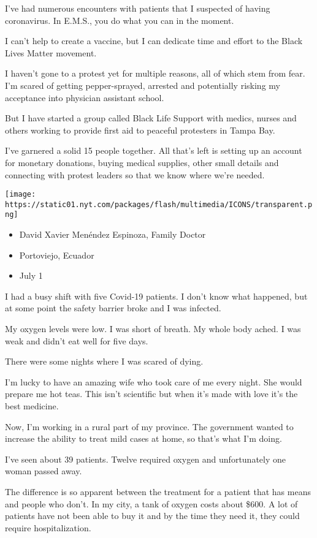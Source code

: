 I've had numerous encounters with patients that I suspected of having
coronavirus. In E.M.S., you do what you can in the moment.

I can't help to create a vaccine, but I can dedicate time and effort to
the Black Lives Matter movement.

I haven't gone to a protest yet for multiple reasons, all of which stem
from fear. I'm scared of getting pepper-sprayed, arrested and
potentially risking my acceptance into physician assistant school.

But I have started a group called Black Life Support with medics, nurses
and others working to provide first aid to peaceful protesters in Tampa
Bay.

I've garnered a solid 15 people together. All that's left is setting up
an account for monetary donations, buying medical supplies, other small
details and connecting with protest leaders so that we know where we're
needed.

\texttt{[image: https://static01.nyt.com/packages/flash/multimedia/ICONS/transparent.png]}

\begin{itemize}
\tightlist
\item
  David Xavier Menéndez Espinoza, Family Doctor
\item
  Portoviejo, Ecuador
\item
  July 1
\end{itemize}

I had a busy shift with five Covid-19 patients. I don't know what
happened, but at some point the safety barrier broke and I was infected.

My oxygen levels were low. I was short of breath. My whole body ached. I
was weak and didn't eat well for five days.

There were some nights where I was scared of dying.

I'm lucky to have an amazing wife who took care of me every night. She
would prepare me hot teas. This isn't scientific but when it's made with
love it's the best medicine.

Now, I'm working in a rural part of my province. The government wanted
to increase the ability to treat mild cases at home, so that's what I'm
doing.

I've seen about 39 patients. Twelve required oxygen and unfortunately
one woman passed away.

The difference is so apparent between the treatment for a patient that
has means and people who don't. In my city, a tank of oxygen costs about
\$600. A lot of patients have not been able to buy it and by the time
they need it, they could require hospitalization.

